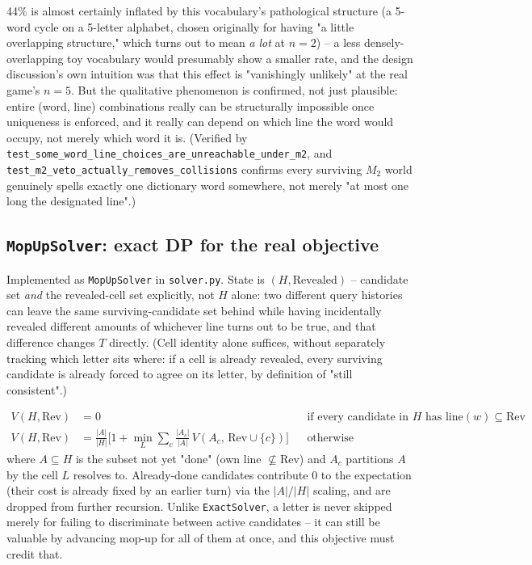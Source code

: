 \documentclass[11pt]{article}
\begin{document}
44\% is almost certainly inflated by this vocabulary's pathological
structure (a 5-word cycle on a 5-letter alphabet, chosen originally for
having "a little overlapping structure," which turns out to mean
\emph{a lot} at $n=2$) -- a less densely-overlapping toy vocabulary would
presumably show a smaller rate, and the design discussion's own intuition
was that this effect is "vanishingly unlikely" at the real game's $n=5$.
But the qualitative phenomenon is confirmed, not just plausible: entire
(word, line) combinations really can be structurally impossible once
uniqueness is enforced, and it really can depend on which line the word
would occupy, not merely which word it is. (Verified by
\texttt{test\_some\_word\_line\_choices\_are\_unreachable\_under\_m2}, and
\texttt{test\_m2\_veto\_actually\_removes\_collisions} confirms every
surviving $M_2$ world genuinely spells exactly one dictionary word
somewhere, not merely "at most one long the designated line".)

\subsection{\texttt{MopUpSolver}: exact DP for the real objective}

Implemented as \texttt{MopUpSolver} in \texttt{solver.py}. State is
$(H, \mathrm{Revealed})$ -- candidate set \emph{and} the revealed-cell
set explicitly, not $H$ alone: two different query histories can leave
the same surviving-candidate set behind while having incidentally
revealed different amounts of whichever line turns out to be true, and
that difference changes $T$ directly. (Cell identity alone suffices,
without separately tracking which letter sits where: if a cell is already
revealed, every surviving candidate is already forced to agree on its
letter, by definition of "still consistent".)

\begin{align}
V(H, \mathrm{Rev}) &= 0 && \text{if every candidate in } H \text{ has } \mathrm{line}(w)\subseteq\mathrm{Rev} \\
V(H, \mathrm{Rev}) &= \tfrac{|A|}{|H|}\Big[1 + \min_L \sum_{c} \tfrac{|A_c|}{|A|}\, V(A_c,\, \mathrm{Rev}\cup\{c\})\Big] && \text{otherwise}
\end{align}
where $A\subseteq H$ is the subset not yet "done" (own line $\not\subseteq
\mathrm{Rev}$) and $A_c$ partitions $A$ by the cell $L$ resolves to.
Already-done candidates contribute $0$ to the expectation (their cost is
already fixed by an earlier turn) via the $|A|/|H|$ scaling, and are
dropped from further recursion. Unlike \texttt{ExactSolver}, a letter is
never skipped merely for failing to discriminate between active
candidates -- it can still be valuable by advancing mop-up for all of
them at once, and this objective must credit that.
\end{document}
